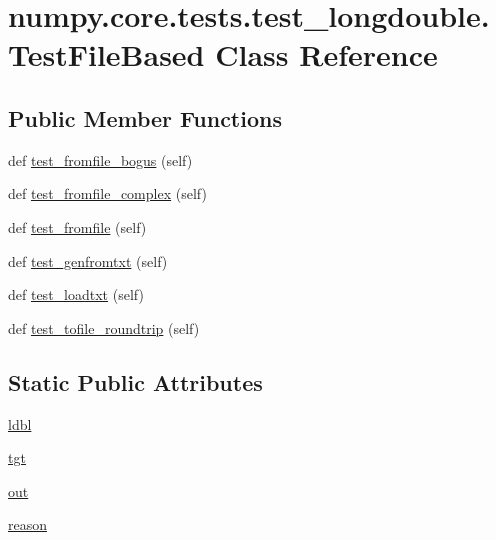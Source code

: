 \hypertarget{classnumpy_1_1core_1_1tests_1_1test__longdouble_1_1TestFileBased}{}\section{numpy.\+core.\+tests.\+test\+\_\+longdouble.\+Test\+File\+Based Class Reference}
\label{classnumpy_1_1core_1_1tests_1_1test__longdouble_1_1TestFileBased}
\subsection*{Public Member Functions}
\begin{DoxyCompactItemize}
\item 
def \hyperlink{classnumpy_1_1core_1_1tests_1_1test__longdouble_1_1TestFileBased_a20f11038ddb2dfb5b9e8f797324883cb}{test\+\_\+fromfile\+\_\+bogus} (self)
\item 
def \hyperlink{classnumpy_1_1core_1_1tests_1_1test__longdouble_1_1TestFileBased_a3218e38811cbbe847794d222f0e6760f}{test\+\_\+fromfile\+\_\+complex} (self)
\item 
def \hyperlink{classnumpy_1_1core_1_1tests_1_1test__longdouble_1_1TestFileBased_aa842de9ab2267cec21641bc4adfb1990}{test\+\_\+fromfile} (self)
\item 
def \hyperlink{classnumpy_1_1core_1_1tests_1_1test__longdouble_1_1TestFileBased_ab92ce79318f9bed3a065479155752a70}{test\+\_\+genfromtxt} (self)
\item 
def \hyperlink{classnumpy_1_1core_1_1tests_1_1test__longdouble_1_1TestFileBased_ad6b33820ae0aa6af35d04f9f75a086ab}{test\+\_\+loadtxt} (self)
\item 
def \hyperlink{classnumpy_1_1core_1_1tests_1_1test__longdouble_1_1TestFileBased_a7a38aa404942a7fef33ee7306e0dcbe1}{test\+\_\+tofile\+\_\+roundtrip} (self)
\end{DoxyCompactItemize}
\subsection*{Static Public Attributes}
\begin{DoxyCompactItemize}
\item 
\hyperlink{classnumpy_1_1core_1_1tests_1_1test__longdouble_1_1TestFileBased_afa739f3d224ca8d5f230444b1d8f0144}{ldbl}
\item 
\hyperlink{classnumpy_1_1core_1_1tests_1_1test__longdouble_1_1TestFileBased_acdab8681a03585b48faaf124a9caa812}{tgt}
\item 
\hyperlink{classnumpy_1_1core_1_1tests_1_1test__longdouble_1_1TestFileBased_ace0a2337e400581c0ca41962522ce391}{out}
\item 
\hyperlink{classnumpy_1_1core_1_1tests_1_1test__longdouble_1_1TestFileBased_aceb7d6c858e5545badf3d93cd79dd9cd}{reason}
\end{DoxyCompactItemize}



